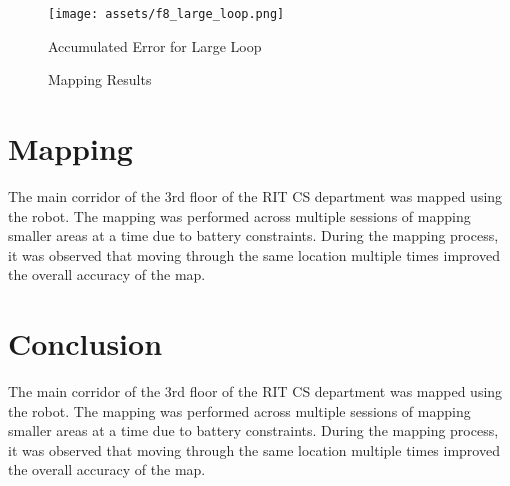 \documentclass[conference, letterpaper]{IEEEtran}
\begin{document}
\begin{figure}[ht]
  \centering
  \texttt{[image: assets/f8\_large\_loop.png]}  
  \caption{Accumulated Error for Large Loop}  
\end{figure}  

\begin{figure*}[!t]
  \centering
  \hfill
  \hfill
  \caption{Mapping Results}  
\end{figure*}  


\newpage

\section{Mapping}

The main corridor of the 3rd floor of the RIT CS department was mapped using the 
robot. The mapping was performed across multiple sessions of mapping smaller 
areas at a time due to battery constraints. During the mapping process, it was 
observed that moving through the same location multiple times improved the 
overall accuracy of the map. 

\section{Conclusion}

The main corridor of the 3rd floor of the RIT CS department was mapped using the 
robot. The mapping was performed across multiple sessions of mapping smaller 
areas at a time due to battery constraints. During the mapping process, it was 
observed that moving through the same location multiple times improved the 
overall accuracy of the map.

\nocite{*}


\end{document}
